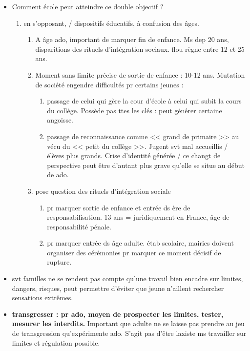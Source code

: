 \documentclass[12pt]{article}
\begin{document}
\begin{itemize}
\item Comment école peut atteindre ce double objectif ?
\begin{enumerate}
\item en s'opposant, / dispositifs éducatifs, à confusion des âges. \\
\begin{enumerate}
\item A âge ado, important de marquer fin de enfance. Ms dep 20 ans, disparitions des rituels d'intégration sociaux. flou règne entre 12 et 25 ans.\\
\item Moment sans limite précise de sortie de enfance : 10-12 ans. Mutation de société engendre difficultés pr certains jeunes : 
\begin{enumerate}
\item passage de celui qui gère la cour d'école à celui qui subit la cours du collège. Possède pas ttes les clés : peut générer certaine angoisse.\\
\item passage de reconnaissance comme << grand de primaire >> au vécu du << petit du collège >>. Jugent svt mal accueillis / élèves plus grands. Crise d'identité générée / ce changt de perspective peut être d'autant plus grave qu'elle se situe au début de ado.\\
\end{enumerate}

\item pose question des rituels d'intégration sociale
\begin{enumerate}
\item pr marquer sortie de enfance et entrée ds ère de responsabilisation. 13 ans = juridiquement en France, âge de responsabilité pénale.
\item pr marquer entrée ds âge adulte. étab scolaire, mairies doivent organiser des cérémonies pr marquer ce moment décisif de rupture.
\end{enumerate}
\end{enumerate}
\end{enumerate}

\item svt familles ne se rendent pas compte qu'une travail bien encadre sur limites, dangers, risques, peut permettre d'éviter que jeune n'aillent rechercher sensations extrêmes.\\
\item \textbf{transgresser : pr ado, moyen de prospecter les limites, tester, mesurer les interdits.} Important que adulte ne se laisse pas prendre au jeu de transgression qu'expérimente ado. S'agit pas d'être laxiste ms travailler sur limites et régulation possible.\\


\end{itemize}
\end{document}
